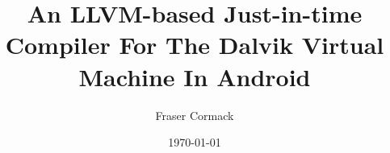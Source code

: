 \documentclass[twoside,abbrevs,bsc,logo,notimes,frontabs]{styles/infthesis}
\title{An LLVM-based Just-in-time Compiler For The Dalvik Virtual Machine In Android}
\author{Fraser Cormack}
\date{\today}
\begin{document}
    \begin{preliminary}
        \maketitle

        
        \standarddeclaration
        
        \tableofcontents
	    \listoffigures
	    \lstlistoflistings
	\end{preliminary}

	
	
		
	
	
	
	
	
	\appendix
	

	
	
\end{document}
